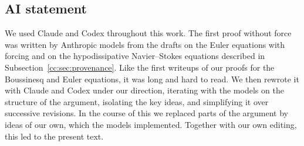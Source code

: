\subsection{AI statement}\label{cc:sec:ai}

We used Claude and Codex throughout this work. The first proof without
force was written by Anthropic models from the drafts on the Euler equations
with forcing and on the hypodissipative Navier--Stokes equations described in
Subsection~\ref{cc:sec:provenance}. Like the first writeups of our
proofs for the Boussinesq and Euler equations, it was long and hard to read. We then
rewrote it with Claude and Codex under our direction, iterating with
the models on the structure of the argument, isolating the key ideas,
and simplifying it over successive revisions. In the course of this we
replaced parts of the argument by ideas of our own, which the models
implemented. Together with our own editing, this led to the present
text.
